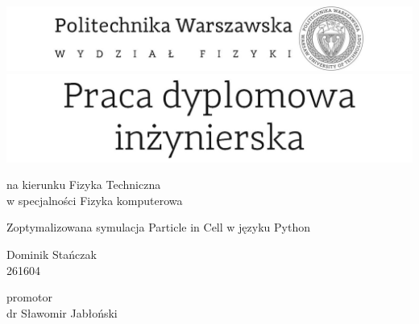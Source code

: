 

\graphicspath{{Source/LogosPW/}}


\thispagestyle{empty}
\center
\includegraphics[scale=1]{logo.jpg}
\center
\includegraphics[scale=1]{praca_dyplomowa.jpg}

\vspace{17mm}

\normalsize
na kierunku Fizyka Techniczna \\ %
w specjalności Fizyka komputerowa \\ %

\vspace{15mm}

\Large
Zoptymalizowana symulacja Particle in Cell w języku Python  \\ %

\vspace{17mm}

\huge
Dominik Stańczak  \\ %
\normalsize
261604 \\ %

\vspace{17mm}

promotor \\
dr Sławomir Jabłoński \\ %

